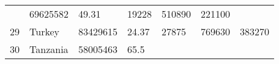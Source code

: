 \documentclass[
]{article}
\begin{document}
\begin{longtable}[]{@{}lllllll@{}}
\begin{minipage}[t]{0.15\columnwidth}
\end{minipage} & \begin{minipage}[t]{0.13\columnwidth}\raggedright
69625582\strut
\end{minipage} & \begin{minipage}[t]{0.13\columnwidth}\raggedright
49.31\strut
\end{minipage} & \begin{minipage}[t]{0.09\columnwidth}\raggedright
19228\strut
\end{minipage} & \begin{minipage}[t]{0.12\columnwidth}\raggedright
510890\strut
\end{minipage} & \begin{minipage}[t]{0.12\columnwidth}\raggedright
221100\strut
\end{minipage}\tabularnewline
\begin{minipage}[t]{0.06\columnwidth}\raggedright
29\strut
\end{minipage} & \begin{minipage}[t]{0.15\columnwidth}\raggedright
Turkey\strut
\end{minipage} & \begin{minipage}[t]{0.13\columnwidth}\raggedright
83429615\strut
\end{minipage} & \begin{minipage}[t]{0.13\columnwidth}\raggedright
24.37\strut
\end{minipage} & \begin{minipage}[t]{0.09\columnwidth}\raggedright
27875\strut
\end{minipage} & \begin{minipage}[t]{0.12\columnwidth}\raggedright
769630\strut
\end{minipage} & \begin{minipage}[t]{0.12\columnwidth}\raggedright
383270\strut
\end{minipage}\tabularnewline
\begin{minipage}[t]{0.06\columnwidth}\raggedright
30\strut
\end{minipage} & \begin{minipage}[t]{0.15\columnwidth}\raggedright
Tanzania\strut
\end{minipage} & \begin{minipage}[t]{0.13\columnwidth}\raggedright
58005463\strut
\end{minipage} & \begin{minipage}[t]{0.13\columnwidth}\raggedright
65.5\strut
\end{minipage} & \begin{minipage}[t]{0.09\columnwidth}\raggedright

\end{minipage}
\end{longtable}
\end{document}
